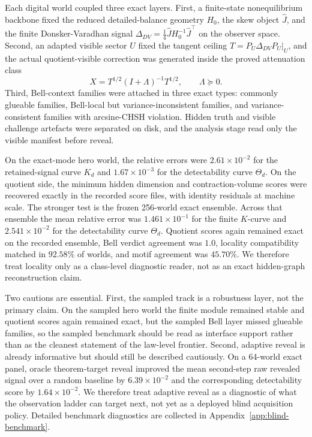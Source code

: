 \documentclass[11pt]{article}
\numberwithin{equation}{section}
\theoremstyle{thmcompact}
\theoremstyle{remark}
\begin{document}
Each digital world coupled three exact layers. First, a finite-state nonequilibrium backbone fixed the reduced detailed-balance geometry $H_0$, the skew object $\widehat J$, and the finite Donsker-Varadhan signal $\Delta_{DV}=\tfrac14\widehat J H_0^{-1}\widehat J^\top$ on the observer space. Second, an adapted visible sector $U$ fixed the tangent ceiling $T=P_U\Delta_{DV}P_U|_U$, and the actual quotient-visible correction was generated inside the proved attenuation class
\[
X=T^{1/2}(I+\Lambda)^{-1}T^{1/2},\qquad \Lambda\succeq 0.
\]
Third, Bell-context families were attached in three exact types: commonly glueable families, Bell-local but variance-inconsistent families, and variance-consistent families with arcsine-CHSH violation. Hidden truth and visible challenge artefacts were separated on disk, and the analysis stage read only the visible manifest before reveal.

On the exact-mode hero world, the relative errors were $2.61\times 10^{-2}$ for the retained-signal curve $K_d$ and $1.67\times 10^{-3}$ for the detectability curve $\Theta_d$. On the quotient side, the minimum hidden dimension and contraction-volume scores were recovered exactly in the recorded score files, with identity residuals at machine scale. The stronger test is the frozen 256-world exact ensemble. Across that ensemble the mean relative error was $1.461\times 10^{-1}$ for the finite $K$-curve and $2.541\times 10^{-2}$ for the detectability curve $\Theta_d$. Quotient scores again remained exact on the recorded ensemble, Bell verdict agreement was $1.0$, locality compatibility matched in $92.58\%$ of worlds, and motif agreement was $45.70\%$. We therefore treat locality only as a class-level diagnostic reader, not as an exact hidden-graph reconstruction claim.

Two cautions are essential. First, the sampled track is a robustness layer, not the primary claim. On the sampled hero world the finite module remained stable and quotient scores again remained exact, but the sampled Bell layer missed glueable families, so the sampled benchmark should be read as interface support rather than as the cleanest statement of the law-level frontier. Second, adaptive reveal is already informative but should still be described cautiously. On a 64-world exact panel, oracle theorem-target reveal improved the mean second-step raw revealed signal over a random baseline by $6.39\times 10^{-2}$ and the corresponding detectability score by $1.64\times 10^{-2}$. We therefore treat adaptive reveal as a diagnostic of what the observation ladder can target next, not yet as a deployed blind acquisition policy. Detailed benchmark diagnostics are collected in Appendix~\ref{app:blind-benchmark}.
\end{document}
